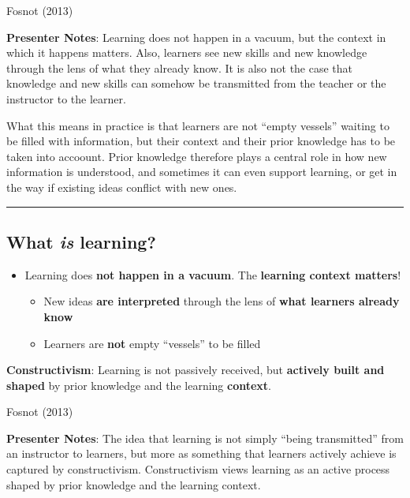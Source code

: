 \documentclass[
  letterpaper,
  DIV=11,
  numbers=noendperiod]{scrartcl}
\providecommand{\tightlist}{%
  \setlength{\itemsep}{0pt}\setlength{\parskip}{0pt}}
\begin{document}
Fosnot (2013)

\textbf{Presenter Notes}: Learning does not happen in a vacuum, but the
context in which it happens matters. Also, learners see new skills and
new knowledge through the lens of what they already know. It is also not
the case that knowledge and new skills can somehow be transmitted from
the teacher or the instructor to the learner.

What this means in practice is that learners are not ``empty vessels''
waiting to be filled with information, but their context and their prior
knowledge has to be taken into accoount. Prior knowledge therefore plays
a central role in how new information is understood, and sometimes it
can even support learning, or get in the way if existing ideas conflict
with new ones.

\begin{center}\rule{0.5\linewidth}{0.5pt}\end{center}

\subsection{\texorpdfstring{What \emph{is}
learning?}{What is learning?}}\label{what-is-learning-2}

\begin{itemize}
\tightlist
\item
  Learning does \textbf{not happen in a vacuum}. The \textbf{learning
  context matters}!

  \begin{itemize}
  \tightlist
  \item
    New ideas \textbf{are interpreted} through the lens of \textbf{what
    learners already know}
  \item
    Learners are \textbf{not} empty ``vessels'' to be filled
  \end{itemize}
\end{itemize}

\textbf{Constructivism}: Learning is not passively received, but
\textbf{actively built and shaped} by prior knowledge and the learning
\textbf{context}.

Fosnot (2013)

\textbf{Presenter Notes}: The idea that learning is not simply ``being
transmitted'' from an instructor to learners, but more as something that
learners actively achieve is captured by constructivism. Constructivism
views learning as an active process shaped by prior knowledge and the
learning context.
\end{document}
